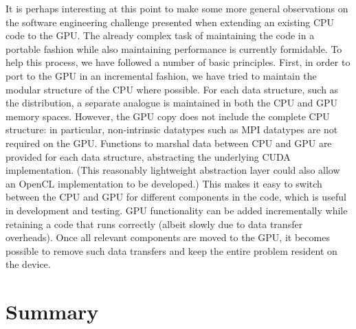 It is perhaps interesting at this point to make some more general
observations on the software engineering challenge presented when
extending an existing CPU code to the GPU. The already complex
task of maintaining the code in a portable fashion while also
maintaining performance is currently formidable. To help this process,
we have followed a number of basic principles. First,
in order to port to the GPU in an incremental fashion,
we have tried to maintain the modular structure of the CPU where
possible. For each data structure, such as the distribution, a separate
analogue is maintained in both the CPU and GPU memory spaces. However,
the GPU copy does not include the complete CPU structure: in
particular, non-intrinsic datatypes such as MPI datatypes are not
required on the GPU. Functions to marshal data between CPU and GPU
are provided for each data structure, abstracting the underlying
CUDA implementation. (This reasonably lightweight abstraction layer
could also allow an OpenCL implementation to be developed.) 
This makes it easy to switch between the CPU and GPU for different
components in the code, which is useful in development
and testing. GPU functionality can be added incrementally while
retaining a code that runs correctly (albeit slowly due to data
transfer overheads).  Once all relevant components are moved to
the GPU, it becomes possible to remove such data transfers and
keep the entire problem resident on the device.





\section{Summary}
\label{ch14:sec:summary}

